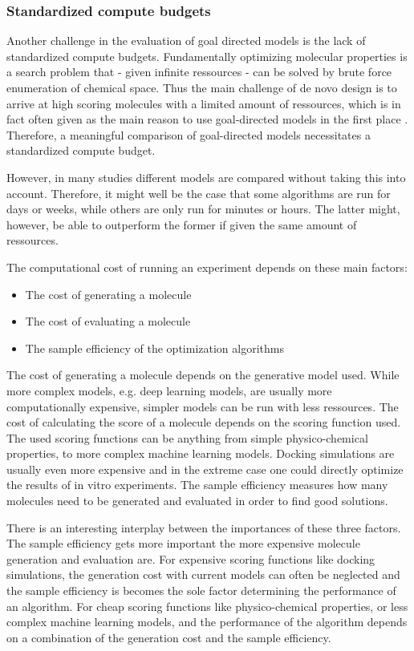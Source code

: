 \subsubsection{Standardized compute budgets}
Another challenge in the evaluation of goal directed models is the lack of 
standardized compute budgets. Fundamentally optimizing molecular properties is 
a search problem that - given infinite ressources - can be solved by brute force enumeration 
of chemical space. Thus the main challenge of de novo design is 
to arrive at high scoring molecules with a limited amount of ressources, 
which is in fact often given as the main reason to use goal-directed models
in the first place \citep{todo}. Therefore, a meaningful comparison of
goal-directed models necessitates a standardized compute budget.

However, in many studies different models are compared without taking this 
into account. Therefore, it might well be the case that some algorithms 
are run for days or weeks, while others are only run for minutes or hours. 
The latter might, however, be able to outperform the former if given the same
amount of ressources.

The computational cost of running an experiment depends on these main factors:
\begin{itemize}
    \item The cost of generating a molecule
    \item The cost of evaluating a molecule
    \item The sample efficiency of the optimization algorithms
\end{itemize}

The cost of generating a molecule depends on the generative model used.
While more complex models, e.g. deep learning models, are usually more 
computationally expensive, simpler models can be run with less ressources. 
The cost of calculating the score of a molecule depends on the scoring function used.
The used scoring functions can be anything from simple physico-chemical
properties, to more complex machine learning models. Docking simulations 
are usually even more expensive and in the extreme case one could directly optimize
the results of in vitro experiments. The sample efficiency measures how many molecules need to be generated and
evaluated in order to find good solutions.

There is an interesting interplay between the importances of these three factors.
The sample efficiency gets more important the more expensive molecule generation 
and evaluation are. For expensive scoring functions like docking simulations, the 
generation cost with current models can often be neglected and the sample efficiency 
is becomes the sole factor determining the performance of an algorithm. For cheap scoring functions
like physico-chemical properties, or less complex machine learning models, 
and the performance of the algorithm depends on a combination of the generation cost
and the sample efficiency.





